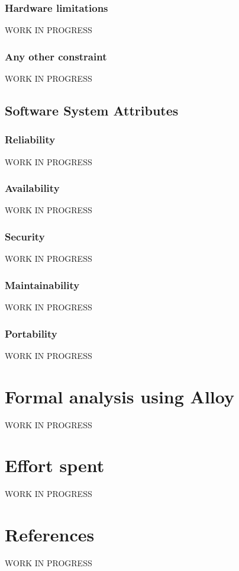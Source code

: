 \documentclass{report}
\begin{document}
			\subsection{Hardware limitations}
			WORK IN PROGRESS
			\subsection{Any other constraint}
			WORK IN PROGRESS
		\section{Software System Attributes}
			\subsection{Reliability}
			WORK IN PROGRESS
			\subsection{Availability}
			WORK IN PROGRESS
			\subsection{Security}
			WORK IN PROGRESS
			\subsection{Maintainability}
			WORK IN PROGRESS
			\subsection{Portability}
			WORK IN PROGRESS
	\chapter{Formal analysis using Alloy}
	WORK IN PROGRESS
	\chapter{Effort spent}
	WORK IN PROGRESS
	\chapter{References}
	WORK IN PROGRESS
	
\end{document}
